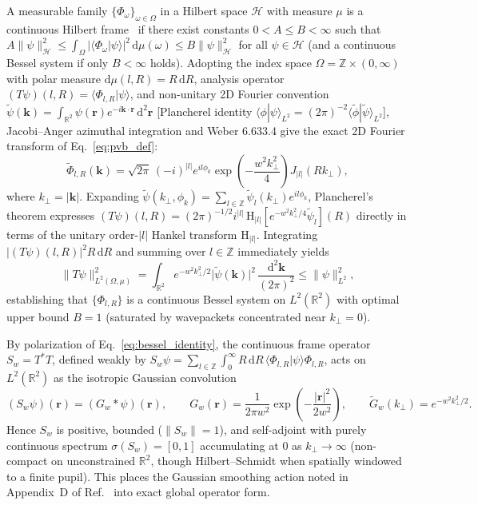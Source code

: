 \documentclass{optica-article}
\newcommand{\braket}[2]{\langle #1 | #2 \rangle}
\newcommand{\norm}[1]{\lVert #1 \rVert}
\newcommand{\abs}[1]{\lvert #1 \rvert}
\newcommand{\dd}{\mathrm{d}}
\begin{document}
A measurable family $\{\Phi_\omega\}_{\omega\in\Omega}$ in a Hilbert space $\mathcal{H}$ with measure $\mu$ is a continuous Hilbert frame~\cite{Duffin1952,Daubechies1990,Ali1993,Christensen2016} if there exist constants $0 < A \le B < \infty$ such that $A\norm{\psi}_{\mathcal{H}}^2 \le \int_\Omega \abs{\braket{\Phi_\omega}{\psi}}^2\,\dd\mu(\omega) \le B\norm{\psi}_{\mathcal{H}}^2$ for all $\psi \in \mathcal{H}$ (and a continuous Bessel system if only $B < \infty$ holds). Adopting the index space $\Omega = \mathbb{Z}\times(0,\infty)$ with polar measure $\dd\mu(l,R) = R\,\dd R$, analysis operator $(T\psi)(l,R) = \braket{\Phi_{l,R}}{\psi}$, and non-unitary 2D Fourier convention $\widetilde{\psi}(\mathbf{k}) = \int_{\mathbb{R}^2}\psi(\mathbf{r})e^{-i\mathbf{k}\cdot\mathbf{r}}\,\dd^2\mathbf{r}$ [Plancherel identity $\braket{\phi}{\psi}_{L^2} = (2\pi)^{-2}\braket{\widetilde{\phi}}{\widetilde{\psi}}_{L^2}$], Jacobi--Anger azimuthal integration and Weber 6.633.4 give the exact 2D Fourier transform of Eq.~\eqref{eq:pvb_def}:
\begin{equation}
  \widetilde{\Phi}_{l,R}(\mathbf{k}) = \sqrt{2\pi}\,(-i)^{\abs{l}} e^{il\phi_k} \exp\!\left(-\frac{w^2 k_\perp^2}{4}\right) J_{\abs{l}}(R k_\perp),
  \label{eq:pvb_ft}
\end{equation}
where $k_\perp = \abs{\mathbf{k}}$. Expanding $\widetilde{\psi}(k_\perp,\phi_k) = \sum_{l\in\mathbb{Z}}\widetilde{\psi}_l(k_\perp)e^{il\phi_k}$, Plancherel's theorem expresses $(T\psi)(l,R) = (2\pi)^{-1/2} i^{\abs{l}}\,\mathrm{H}_{\abs{l}}[e^{-w^2 k_\perp^2/4}\widetilde{\psi}_l](R)$ directly in terms of the unitary order-$\abs{l}$ Hankel transform $\mathrm{H}_{\abs{l}}$. Integrating $\abs{(T\psi)(l,R)}^2 R\,\dd R$ and summing over $l \in \mathbb{Z}$ immediately yields
\begin{equation}
  \norm{T\psi}_{L^2(\Omega,\mu)}^2 = \int_{\mathbb{R}^2} e^{-w^2 k_\perp^2/2}\abs{\widetilde{\psi}(\mathbf{k})}^2\,\frac{\dd^2\mathbf{k}}{(2\pi)^2} \le \norm{\psi}_{L^2}^2,
  \label{eq:bessel_identity}
\end{equation}
establishing that $\{\Phi_{l,R}\}$ is a continuous Bessel system on $L^2(\mathbb{R}^2)$ with optimal upper bound $B = 1$ (saturated by wavepackets concentrated near $k_\perp = 0$).

By polarization of Eq.~\eqref{eq:bessel_identity}, the continuous frame operator $S_w = T^* T$, defined weakly by $S_w\psi = \sum_{l\in\mathbb{Z}}\int_0^\infty R\,\dd R\,\braket{\Phi_{l,R}}{\psi}\Phi_{l,R}$, acts on $L^2(\mathbb{R}^2)$ as the isotropic Gaussian convolution
\begin{equation}
  (S_w\psi)(\mathbf{r}) = (G_w * \psi)(\mathbf{r}), \qquad G_w(\mathbf{r}) = \frac{1}{2\pi w^2}\exp\!\left(-\frac{\abs{\mathbf{r}}^2}{2w^2}\right), \qquad \widetilde{G}_w(k_\perp) = e^{-w^2 k_\perp^2/2}.
  \label{eq:frame_conv}
\end{equation}
Hence $S_w$ is positive, bounded ($\norm{S_w} = 1$), and self-adjoint with purely continuous spectrum $\sigma(S_w) = [0,1]$ accumulating at $0$ as $k_\perp \to \infty$ (non-compact on unconstrained $\mathbb{R}^2$, though Hilbert--Schmidt when spatially windowed to a finite pupil). This places the Gaussian smoothing action noted in Appendix~D of Ref.~\cite{Ferreira2026} into exact global operator form.
\end{document}

